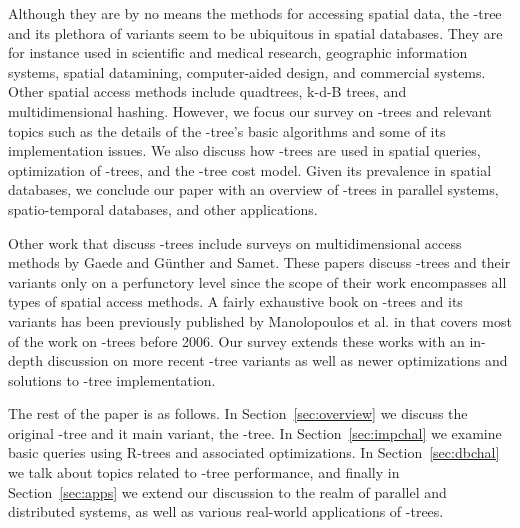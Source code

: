 Although they are by no means the methods for accessing spatial data, the \rbase-tree and 
its plethora of variants seem to be ubiquitous in spatial databases. They are for instance 
used in scientific and medical research, geographic information systems, spatial datamining, 
computer-aided design, and commercial systems. Other spatial access methods include 
quadtrees, k-d-B trees, and multidimensional hashing\cite{samet95, gaedegunther98}.
However, we focus our survey on \rbase-trees and relevant topics such as the details of 
the \rbase-tree's basic algorithms and some of its implementation issues. We also discuss 
how \rbase-trees are used in spatial queries, optimization of \rbase-trees, and the 
\rbase-tree cost model. Given its prevalence in spatial databases, we conclude our paper with 
an overview of \rbase-trees in parallel systems, spatio-temporal databases, and other applications. 

Other work that discuss \rbase-trees include surveys on multidimensional access methods
by Gaede and G\"{u}nther \cite{gaedegunther98} and Samet\cite{samet95}. These papers
discuss \rbase-trees and their variants only on a perfunctory level since the scope of their 
work encompasses all types of spatial access methods. A fairly exhaustive book on 
\rbase-trees and its variants has been previously published by Manolopoulos et al.
in \cite{thebook} that covers most of the work on \rbase-trees before 2006. Our survey 
extends these works with an in-depth discussion on more recent \rbase-tree variants as 
well as newer optimizations and solutions to \rbase-tree implementation.

The rest of the paper is as follows. In Section~\ref{sec:overview} we discuss the
original \rbase-tree and it main variant, the \rstar-tree. In Section~\ref{sec:impchal}
we examine basic queries using R-trees and associated optimizations. In 
Section~\ref{sec:dbchal} we talk about topics related to \rbase-tree performance, and 
finally in Section~\ref{sec:apps} we extend our discussion to the realm of parallel and
distributed systems, as well as various real-world applications of \rbase-trees.


